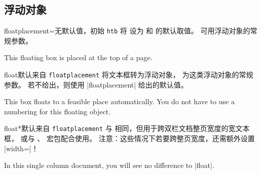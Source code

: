 
\clearpage
\subsection{浮动对象}
\begin{docTcbKey}{floatplacement}{=}{无默认值，初始 \texttt{htb}}
  将  设为  和  的默认取值。
  可用浮动对象的常规参数。
\begin{dispListing}

\begin{tcolorbox}[floatplacement=t,float,
                  title=Floating box from |floatplacement|,
                  watermark text={I am floating}]
  This floating box is placed at the top of a page.
\end{tcolorbox}
\end{dispListing}
\end{docTcbKey}
{\tcbusetemp}


\begin{docTcbKey}{float}{}{默认来自 \texttt{floatplacement}}
  将文本框转为浮动对象， 为这类浮动对象的常规参数。
  若不给出，则使用 |floatplacement| 给出的默认值。
\begin{dispListing}
\begin{tcolorbox}[float, title=Floating box from |float|,
    enhanced,watermark text={I'm also floating}]
  This box floats to a feasible place automatically. You do not have to
  use a numbering for this floating object.
\end{tcolorbox}
\end{dispListing}
\end{docTcbKey}
{\tcbusetemp}


\begin{docTcbKey}{float*}{}{默认来自 \texttt{floatplacement}}
  与  相同，但用于跨双栏文档整页宽度的宽文本框，
  或与 、 宏包配合使用。
  注意：这些情况下若要跨整页宽度，还需额外设置 |width=\textwidth|！
\begin{dispListing}
\begin{tcolorbox}[float*=b, title=Floating box from |float*|,width=\textwidth,
    enhanced,watermark text={I'm also floating}]
  In this single column document, you will see no difference to |float|.
\end{tcolorbox}
\end{dispListing}
\end{docTcbKey}
{\tcbusetemp}


